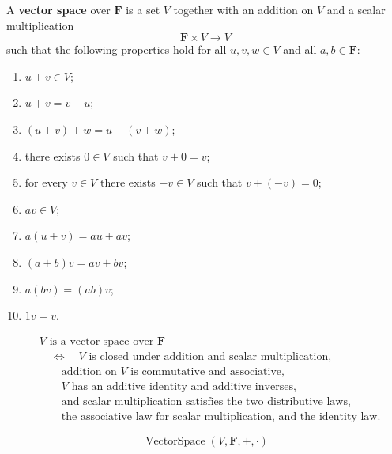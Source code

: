 \begin{tcolorbox}[colback=defbox, colframe=defborder, arc=2pt,
  left=6pt, right=6pt, top=4pt, bottom=4pt,
  title={\small\textbf{Definition (Vector Space)}},
  fonttitle=\small\bfseries]
\begin{definition}
\label{def:vector-space}
A \textbf{vector space} over $\mathbf{F}$ is a set $V$ together with an
addition on $V$ and a scalar multiplication
\[
\mathbf{F} \times V \to V
\]
such that the following properties hold for all $u,v,w \in V$ and all
$a,b \in \mathbf{F}$:
\begin{enumerate}[label=(\roman*)]
  \item $u + v \in V$;
  \item $u + v = v + u$;
  \item $(u + v) + w = u + (v + w)$;
  \item there exists $0 \in V$ such that $v + 0 = v$;
  \item for every $v \in V$ there exists $-v \in V$ such that
        $v + (-v) = 0$;
  \item $av \in V$;
  \item $a(u+v) = au + av$;
  \item $(a+b)v = av + bv$;
  \item $a(bv) = (ab)v$;
  \item $1v = v$.
\end{enumerate}
\end{definition}
\end{tcolorbox}

\begin{remark*}
\[
\begin{aligned}
&V \text{ is a vector space over } \mathbf{F} \\
&\quad\Longleftrightarrow\quad
\text{$V$ is closed under addition and scalar multiplication,} \\
&\qquad\text{addition on $V$ is commutative and associative,} \\
&\qquad\text{$V$ has an additive identity and additive inverses,} \\
&\qquad\text{and scalar multiplication satisfies the two distributive laws,} \\
&\qquad\text{the associative law for scalar multiplication, and the identity law.}
\end{aligned}
\]
\end{remark*}

\begin{remark*}
\[
\operatorname{VectorSpace}(V,\mathbf{F},+,\cdot)
\]
\end{remark*}

